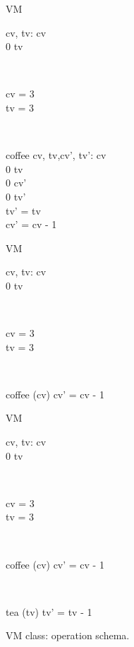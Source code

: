 \begin{figure}[H]
\centering
\begin{sidebyside}[3]
\begin{class}{VM}
\\
\begin{state}
cv, tv: \integer
{} \leq  cv 
\\
0 \leq  tv 
\end{state} 
\\
\begin{init}
cv = 3
\\tv = 3
\end{init} 
\\
\begin{op}{coffee}
cv, tv,cv', tv': \integer
{} \leq  cv 
\\
0 \leq  tv 
\\
0 \leq  cv' 
\\
0 \leq  tv' 
\\
tv' = tv
\\
cv' = cv - 1
\end{op}
\end{class}
\nextside
\begin{class}{VM}
\\
\begin{state}
cv, tv: \integer
{} \leq  cv 
\\
0 \leq  tv 
\end{state} 
\\
\begin{init}
cv = 3
\\tv = 3
\end{init} 
\\
\begin{op}{coffee}
\Delta (cv)
\ST
cv' = cv - 1
\end{op}
\end{class}
\nextside
\begin{class}{VM}
\\
\begin{state}
cv, tv: \integer
{} \leq  cv 
\\
0 \leq  tv 
\end{state} 
\\
\begin{init}
cv = 3
\\tv = 3
\end{init} 
\\
\begin{op}{coffee}
\Delta (cv)
\ST
cv' = cv - 1
\end{op}
\\
\begin{op}{tea}
\Delta (tv)
\ST
tv' = tv - 1
\end{op}
\end{class}
\end{sidebyside}
\caption{VM class: operation schema.}
\label{fig_oz_vm_operation_schema}
\end{figure}
